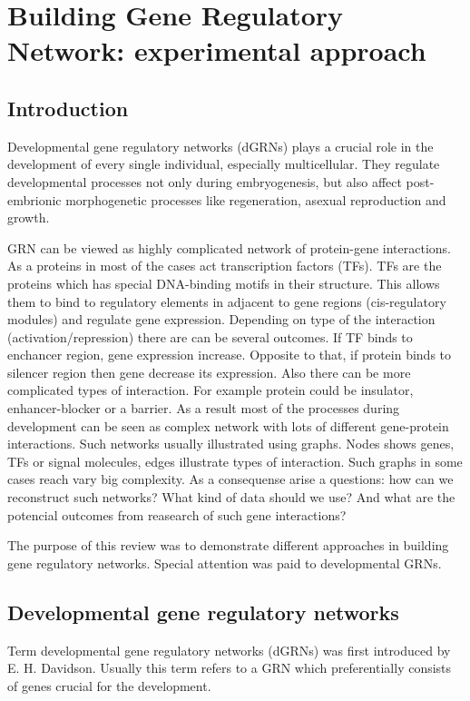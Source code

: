 \documentclass[a4paper, twoside]{report}
\begin{document}
\chapter*{Building Gene Regulatory Network: experimental approach}
\section*{Introduction}

Developmental gene regulatory networks (dGRNs) plays a crucial role in the development of every single individual, especially multicellular. 
They regulate developmental processes not only during embryogenesis, but also affect post-embrionic morphogenetic processes like regeneration, asexual reproduction and growth.

GRN can be viewed as highly complicated network of protein-gene interactions. 
As a proteins in most of the cases act transcription factors (TFs). 
TFs are the proteins which has special DNA-binding motifs in their structure. 
This allows them to bind to regulatory elements in adjacent to gene regions (cis-regulatory modules) and regulate gene expression.
Depending on type of the interaction (activation/repression) there are can be several outcomes.
If TF binds to enchancer region, gene expression increase.
Opposite to that, if protein binds to silencer region then gene decrease its expression.
Also there can be more complicated types of interaction. 
For example protein could be insulator, enhancer-blocker or a barrier.
As a result most of the processes during development can be seen as complex network with lots of different gene-protein interactions.
Such networks usually illustrated using graphs.  
Nodes shows genes, TFs or signal molecules, edges illustrate types of interaction.
Such graphs in some cases reach vary big complexity.
As a consequense arise a questions: how can we reconstruct such networks? 
What kind of data should we use? 
And what are the potencial outcomes from reasearch of such gene interactions?

The purpose of this review was to demonstrate different approaches in building gene regulatory networks.
Special attention was paid to developmental GRNs.  

\section*{Developmental gene regulatory networks}

Term developmental gene regulatory networks (dGRNs) was first introduced by E. H. Davidson.
Usually this term refers to a GRN which preferentially consists of genes crucial for the development. 
\end{document}
